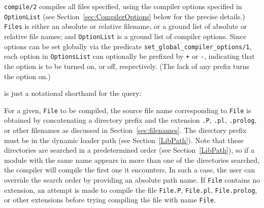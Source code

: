 \begin{description}
%
{\tt compile/2} compiles all files specified, using the compiler
options specified in {\tt OptionList} (see
Section~\ref{sec:CompilerOptions} below for the precise details.)
{\tt Files} is either an absolute or relative filename, or a ground
list of absolute or relative file names; and {\tt OptionList} is a
ground list of compiler options.  Since options can be set globally
via the predicate {\tt set\_global\_compiler\_options/1}, each option
in {\tt OptionsList} can optionally be prefixed by \verb|+| or
\verb|-|, indicating that the option is to be turned on, or off,
respectively.  (The lack of any prefix turns the option on.)


\noindent
is just a notational shorthand for the query:



For a given, {\tt File} to be compiled, the source file name
corresponding to {\tt File} is obtained by concatenating a directory
prefix and the extension {\tt .P}, {\tt .pl}, {\tt .prolog}, or other filenames as
discussed in Section~\ref{sec:filenames}.  The directory prefix must
be in the dynamic loader path (see Section~\ref{LibPath}).  Note that
these directories are searched in a predetermined order (see
Section~\ref{LibPath}), so if a module with the same name appears in
more than one of the directories searched, the compiler will compile
the first one it encounters.  In such a case, the user can override
the search order by providing an absolute path name.
%
If {\tt File} contains no extension, an attempt is made to compile the
file {\tt File.P}, {\tt File.pl}, {\tt File.prolog}, or other extensions 
before trying compiling the file with name {\tt File}.


\end{description}

